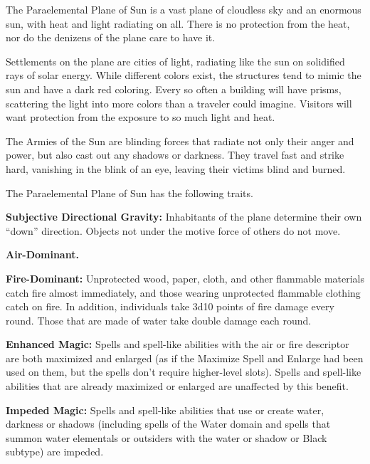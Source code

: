 The Paraelemental Plane of Sun is a vast plane of cloudless sky and an enormous sun, with heat and light radiating on all. There is no protection from the heat, nor do the denizens of the plane care to have it.

Settlements on the plane are cities of light, radiating like the sun on solidified rays of solar energy. While different colors exist, the structures tend to mimic the sun and have a dark red coloring. Every so often a building will have prisms, scattering the light into more colors than a traveler could imagine. Visitors will want protection from the exposure to so much light and heat.

The Armies of the Sun are blinding forces that radiate not only their anger and power, but also cast out any shadows or darkness. They travel fast and strike hard, vanishing in the blink of an eye, leaving their victims blind and burned.

The Paraelemental Plane of Sun has the following traits.
\begin{itemize*}
\item \textbf{Subjective Directional Gravity:} Inhabitants of the plane determine their own ``down'' direction. Objects not under the motive force of others do not move.
\item \textbf{Air-Dominant.}
\item \textbf{Fire-Dominant:} Unprotected wood, paper, cloth, and other flammable materials catch fire almost immediately, and those wearing unprotected flammable clothing catch on fire. In addition, individuals take 3d10 points of fire damage every round. Those that are made of water take double damage each round.
\item \textbf{Enhanced Magic:} Spells and spell-like abilities with the air or fire descriptor are both maximized and enlarged (as if the Maximize Spell and Enlarge had been used on them, but the spells don't require higher-level slots). Spells and spell-like abilities that are already maximized or enlarged are unaffected by this benefit.
\item \textbf{Impeded Magic:} Spells and spell-like abilities that use or create water, darkness or shadows (including spells of the Water domain and spells that summon water elementals or outsiders with the water or shadow or Black subtype) are impeded.
\end{itemize*}
